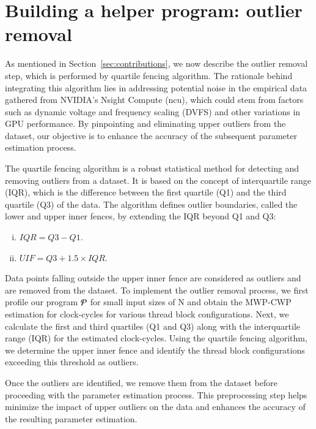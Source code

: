 \section{Building a helper program: outlier removal}
\label{sec:outlier_removal}
As mentioned in Section~\ref{sec:contributions}, we now describe the outlier removal step,
which is performed by quartile fencing algorithm. 
The rationale behind integrating this algorithm lies in addressing potential 
noise in the empirical data gathered from NVIDIA's Nsight Compute (ncu), which could stem 
from factors such as dynamic voltage and frequency scaling (DVFS) and other variations in 
GPU performance. By pinpointing and eliminating upper outliers from the dataset, our 
objective is to enhance the accuracy of the subsequent parameter estimation process.

The quartile fencing algorithm is a robust statistical method for detecting and removing 
outliers from a dataset. It is based on the concept of interquartile range (IQR), which is 
the difference between the first quartile (Q1) and the third quartile (Q3) of the data. The 
algorithm defines outlier boundaries, called the lower and upper inner fences, by extending 
the IQR beyond Q1 and Q3\cite{everitt2010cambridge}:

\begin{enumerate}[(i)]
    \item $IQR = Q3 - Q1$.
    \item $UIF = Q3 + 1.5 \times IQR$.
\end{enumerate}

Data points falling outside the upper inner fence are considered as outliers and are removed from the 
dataset. To implement the outlier removal process, we first profile our program ${\cal P}$ for 
small input sizes of N and obtain the MWP-CWP estimation for clock-cycles for various thread block configurations. 
Next, we calculate the first and third quartiles (Q1 and Q3) along with the interquartile range 
(IQR) for the estimated clock-cycles. Using the quartile fencing algorithm, we determine the 
upper inner fence and identify the thread block configurations exceeding this threshold as outliers.

Once the outliers are identified, we remove them from the dataset before proceeding with the parameter
estimation process. This preprocessing step helps minimize the impact of upper outliers on the data 
and enhances the accuracy of the resulting parameter estimation. 


